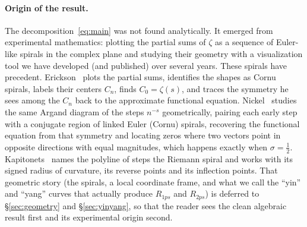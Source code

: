 \documentclass[11pt]{article}
\theoremstyle{definition}
\begin{document}
\paragraph{Origin of the result.} The decomposition~\eqref{eq:main} was not found analytically.
It emerged from experimental mathematics: plotting the partial sums of $\zeta$ as
a sequence of Euler-like spirals in the complex plane and studying their geometry with a
visualization tool we have developed (and published) over several years. These
spirals have precedent. Erickson~\cite{Erickson2005} plots the partial
sums, identifies the shapes as Cornu spirals, labels their centers $C_n$, finds
$C_0=\zeta(s)$, and traces the symmetry he sees among the $C_n$ back to the
approximate functional equation. Nickel~\cite{Nickel2013,Nickel2015} studies the
same Argand
diagram of the steps $n^{-s}$ geometrically, pairing each early step with a
conjugate region of linked Euler (Cornu) spirals, recovering the functional
equation from that symmetry and locating zeros where two vectors point in
opposite directions with equal magnitudes, which happens exactly when
$\sigma=\tfrac12$. Kapitonets~\cite{Kapitonets2019} names the polyline of steps
the Riemann spiral and works with its signed radius of curvature, its reverse
points and its inflection points. That
geometric story (the spirals, a local coordinate frame, and what we call the
``yin'' and ``yang'' curves that actually produce $R_{1ps}$ and $R_{2ps}$) is deferred to
\S\ref{sec:geometry} and \S\ref{sec:yinyang}, so that the reader sees the clean
algebraic result first and its experimental origin second.
\end{document}
